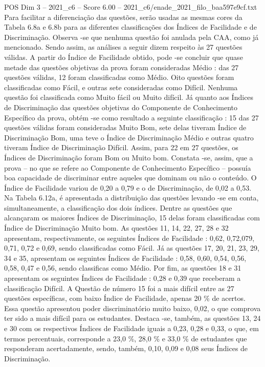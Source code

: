 \begin{textsample}{POS Dim 3 – 2021\_c6 – Score 6.00 – 2021\_c6/enade\_2021\_filo\_baa597e9cf.txt}
Para facilitar a diferenciação das questões, serão usadas as mesmas cores da Tabela 6.8a e 6.8b para as diferentes classificações dos Índices de Facilidade e de Discriminação.
Observa -se que nenhuma questão foi anulada pela CAA, como já mencionado.
Sendo assim, as análises a seguir dizem respeito às 27 questões válidas.
A partir do Índice de Facilidade obtido, pode -se concluir que quase metade das questões objetivas da prova foram consideradas Médio : das 27 questões válidas, 12 foram classificadas como Médio.
Oito questões foram classificadas como Fácil, e outras sete consideradas como Difícil.
Nenhuma questão foi classificada como Muito fácil ou Muito difícil.
Já quanto aos Índices de Discriminação das questões objetivas do Componente de Conhecimento Específico da prova, obtém -se como resultado a seguinte classificação : 15 das 27 questões válidas foram consideradas Muito Bom, sete delas tiveram Índice de Discriminação Bom, uma teve o Índice de Discriminação Médio e outras quatro tiveram Índice de Discriminação Difícil.
Assim, para 22 em 27 questões, os Índices de Discriminação foram Bom ou Muito bom.
Constata -se, assim, que a prova – no que se refere ao Componente de Conhecimento Específico – possuía boa capacidade de discriminar entre aqueles que dominam ou não o conteúdo.
O Índice de Facilidade variou de 0,20 a 0,79 e o de Discriminação, de 0,02 a 0,53.
Na Tabela 6.12a, é apresentada a distribuição das questões levando -se em conta, simultaneamente, a classificação dos dois índices.
Dentre as questões que alcançaram os maiores Índices de Discriminação, 15 delas foram classificadas com Índice de Discriminação Muito bom.
As questões 11, 14, 22, 27, 28 e 32 apresentam, respectivamente, os seguintes Índices de Facilidade : 0,62, 0,72,079, 0,71, 0,72 e 0,69, sendo classificadas como Fácil.
Já as questões 17, 20, 21, 23, 29, 34 e 35, apresentam os seguintes Índices de Facilidade : 0,58, 0,60, 0,54, 0,56, 0,58, 0,47 e 0,56, sendo classificas como Médio.
Por fim, as questões 18 e 31 apresentam os seguintes Índices de Facilidade : 0,28 e 0,39 que receberam a classificação Difícil.
A Questão de número 15 foi a mais difícil entre as 27 questões específicas, com baixo Índice de Facilidade, apenas 20 \% de acertos.
Essa questão apresentou poder discriminatório muito baixo, 0,02, o que comprova ter sido a mais difícil para os estudantes.
Destaca -se, também, as questões 13, 24 e 30 com os respectivos Índices de Facilidade iguais a 0,23, 0,28 e 0,33, o que, em termos percentuais, corresponde a 23,0 \%, 28,0 \% e 33,0 \% de estudantes que responderam acertadamente, sendo, também, 0,10, 0,09 e 0,08 seus Índices de Discriminação.

\end{textsample}
